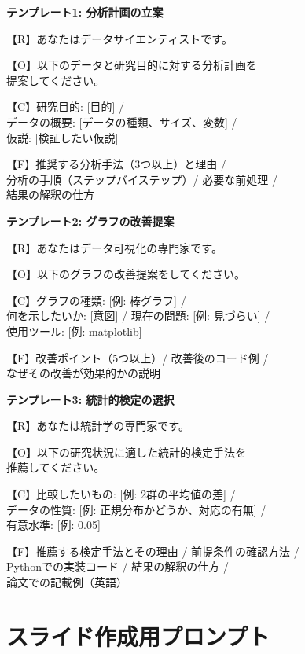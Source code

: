 \begin{promptbox}
\textbf{テンプレート1: 分析計画の立案}

【R】あなたはデータサイエンティストです。

【O】以下のデータと研究目的に対する分析計画を\\
提案してください。

【C】研究目的: [目的] /\\
データの概要: [データの種類、サイズ、変数] /\\
仮説: [検証したい仮説]

【F】推奨する分析手法（3つ以上）と理由 /\\
分析の手順（ステップバイステップ）/ 必要な前処理 /\\
結果の解釈の仕方
\end{promptbox}

\begin{promptbox}
\textbf{テンプレート2: グラフの改善提案}

【R】あなたはデータ可視化の専門家です。

【O】以下のグラフの改善提案をしてください。

【C】グラフの種類: [例: 棒グラフ] /\\
何を示したいか: [意図] / 現在の問題: [例: 見づらい] /\\
使用ツール: [例: matplotlib]

【F】改善ポイント（5つ以上）/ 改善後のコード例 /\\
なぜその改善が効果的かの説明
\end{promptbox}

\begin{promptbox}
\textbf{テンプレート3: 統計的検定の選択}

【R】あなたは統計学の専門家です。

【O】以下の研究状況に適した統計的検定手法を\\
推薦してください。

【C】比較したいもの: [例: 2群の平均値の差] /\\
データの性質: [例: 正規分布かどうか、対応の有無] /\\
有意水準: [例: 0.05]

【F】推薦する検定手法とその理由 / 前提条件の確認方法 /\\
Pythonでの実装コード / 結果の解釈の仕方 /\\
論文での記載例（英語）
\end{promptbox}

\section{スライド作成用プロンプト}


